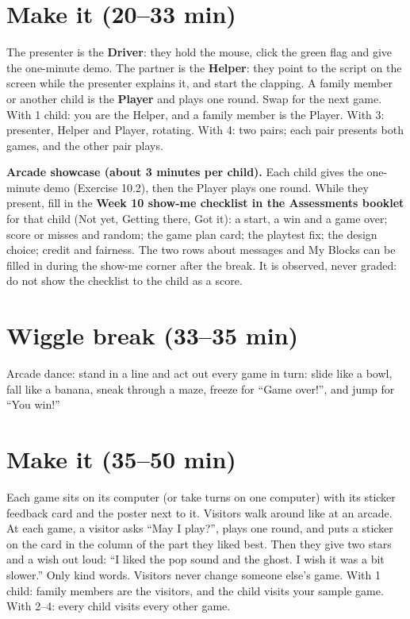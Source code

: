 \section{Make it (20--33 min)}
\begin{pairroles}
The presenter is the \textbf{Driver}: they hold the mouse, click the green flag and give the one-minute demo. The partner is the \textbf{Helper}: they point to the script on the screen while the presenter explains it, and start the clapping. A family member or another child is the \textbf{Player} and plays one round. Swap for the next game. With 1 child: you are the Helper, and a family member is the Player. With 3: presenter, Helper and Player, rotating. With 4: two pairs; each pair presents both games, and the other pair plays.
\end{pairroles}

\textbf{Arcade showcase (about 3 minutes per child).} Each child gives the one-minute demo (Exercise 10.2), then the Player plays one round. While they present, fill in the \textbf{Week 10 show-me checklist in the Assessments booklet} for that child (Not yet, Getting there, Got it): a start, a win and a game over; score or misses and random; the game plan card; the playtest fix; the design choice; credit and fairness. The two rows about messages and My Blocks can be filled in during the show-me corner after the break. It is observed, never graded: do not show the checklist to the child as a score.

\section{Wiggle break (33--35 min)}
Arcade dance: stand in a line and act out every game in turn: slide like a bowl, fall like a banana, sneak through a maze, freeze for \enquote{Game over!}, and jump for \enquote{You win!}

\section{Make it (35--50 min)}
\begin{unplugged}
Each game sits on its computer (or take turns on one computer) with its sticker feedback card and the poster next to it. Visitors walk around like at an arcade. At each game, a visitor asks \enquote{May I play?}, plays one round, and puts a sticker on the card in the column of the part they liked best. Then they give two stars and a wish out loud: \enquote{I liked the pop sound and the ghost. I wish it was a bit slower.} Only kind words. Visitors never change someone else's game. With 1 child: family members are the visitors, and the child visits your sample game. With 2--4: every child visits every other game.
\end{unplugged}

